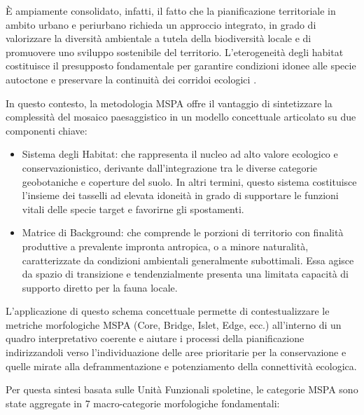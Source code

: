 \documentclass[
  a4paper,
]{book}
\providecommand{\tightlist}{%
  \setlength{\itemsep}{0pt}\setlength{\parskip}{0pt}}
\begin{document}
È ampiamente consolidato, infatti, il fatto che la pianificazione territoriale in ambito urbano e periurbano richieda un approccio integrato, in grado di valorizzare la diversità ambientale a tutela della biodiversità locale e di promuovere uno sviluppo sostenibile del territorio.
L'eterogeneità degli habitat costituisce il presupposto fondamentale per garantire condizioni idonee alle specie autoctone e preservare la continuità dei corridoi ecologici \citep{battisti2004, vilenica2020}.

In questo contesto, la metodologia MSPA offre il vantaggio di sintetizzare la complessità del mosaico paesaggistico in un modello concettuale articolato su due componenti chiave:

\begin{itemize}
\tightlist
\item
  Sistema degli Habitat: che rappresenta il nucleo ad alto valore ecologico e conservazionistico, derivante dall'integrazione tra le diverse categorie geobotaniche e coperture del suolo. In altri termini, questo sistema costituisce l'insieme dei tasselli ad elevata idoneità in grado di supportare le funzioni vitali delle specie target e favorirne gli spostamenti.
\item
  Matrice di Background: che comprende le porzioni di territorio con finalità produttive a prevalente impronta antropica, o a minore naturalità, caratterizzate da condizioni ambientali generalmente subottimali. Essa agisce da spazio di transizione e tendenzialmente presenta una limitata capacità di supporto diretto per la fauna locale.
\end{itemize}

L'applicazione di questo schema concettuale permette di contestualizzare le metriche morfologiche MSPA (Core, Bridge, Islet, Edge, ecc.) all'interno di un quadro interpretativo coerente e aiutare i processi della pianificazione indirizzandoli verso l'individuazione delle aree prioritarie per la conservazione e quelle mirate alla deframmentazione e potenziamento della connettività ecologica.

Per questa sintesi basata sulle Unità Funzionali spoletine, le categorie MSPA sono state aggregate in 7 macro-categorie morfologiche fondamentali:
\end{document}
